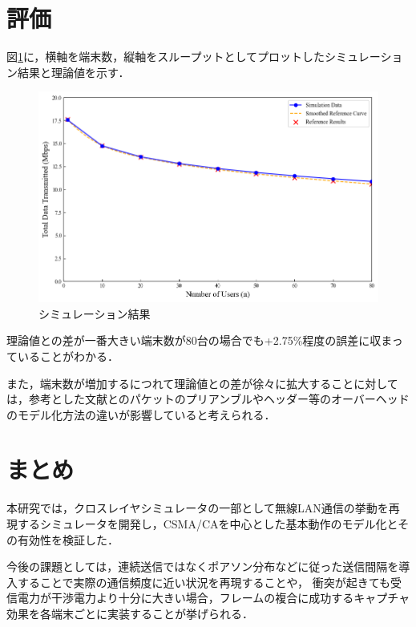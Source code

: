 \documentclass[a4paper, 10pt]{ltjsarticle}
\begin{document}
\section{評価}
図\ref{fig:simulation-result}に，横軸を端末数，縦軸をスループットとしてプロットしたシミュレーション結果と理論値を示す．


\begin{figure}[H]
  \centering
  \includegraphics[width=1\columnwidth]{./assets/g3.png}
  \caption{シミュレーション結果}
  \label{fig:simulation-result}
\end{figure}


理論値との差が一番大きい端末数が80台の場合でも+2.75\%程度の誤差に収まっていることがわかる．

また，端末数が増加するにつれて理論値との差が徐々に拡大することに対しては，参考とした文献\cite{paper}とのパケットのプリアンブルやヘッダー等のオーバーヘッドのモデル化方法の違いが影響していると考えられる．

\section{まとめ}
本研究では，クロスレイヤシミュレータの一部として無線LAN通信の挙動を再現するシミュレータを開発し，CSMA/CAを中心とした基本動作のモデル化とその有効性を検証した．

今後の課題としては，連続送信ではなくポアソン分布などに従った送信間隔を導入することで実際の通信頻度に近い状況を再現することや，
衝突が起きても受信電力が干渉電力より十分に大きい場合，フレームの複合に成功するキャプチャ効果を各端末ごとに実装することが挙げられる．


\end{document}

